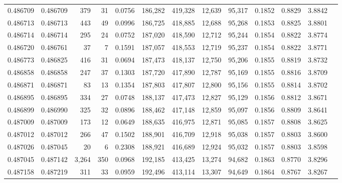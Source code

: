 \begin{tabular}{rrrrrrrrrrrrr}
0.486709 & 0.486709 &   379 &    31 &                                     0.0756 & 186,282 & 419,328 &  12,639 &  95,317 & 0.1852 & 0.8829 & 3.8842 \\
0.486713 & 0.486713 &   443 &    49 &                                     0.0996 & 186,725 & 418,885 &  12,688 &  95,268 & 0.1853 & 0.8825 & 3.8801 \\
0.486714 & 0.486714 &   295 &    24 &                                     0.0752 & 187,020 & 418,590 &  12,712 &  95,244 & 0.1854 & 0.8822 & 3.8774 \\
0.486720 & 0.486761 &    37 &     7 &                                     0.1591 & 187,057 & 418,553 &  12,719 &  95,237 & 0.1854 & 0.8822 & 3.8771 \\
0.486773 & 0.486825 &   416 &    31 &                                     0.0694 & 187,473 & 418,137 &  12,750 &  95,206 & 0.1855 & 0.8819 & 3.8732 \\
0.486858 & 0.486858 &   247 &    37 &                                     0.1303 & 187,720 & 417,890 &  12,787 &  95,169 & 0.1855 & 0.8816 & 3.8709 \\
0.486871 & 0.486871 &    83 &    13 &                                     0.1354 & 187,803 & 417,807 &  12,800 &  95,156 & 0.1855 & 0.8814 & 3.8702 \\
0.486895 & 0.486895 &   334 &    27 &                                     0.0748 & 188,137 & 417,473 &  12,827 &  95,129 & 0.1856 & 0.8812 & 3.8671 \\
0.486899 & 0.486990 &   325 &    32 &                                     0.0896 & 188,462 & 417,148 &  12,859 &  95,097 & 0.1856 & 0.8809 & 3.8641 \\
0.487009 & 0.487009 &   173 &    12 &                                     0.0649 & 188,635 & 416,975 &  12,871 &  95,085 & 0.1857 & 0.8808 & 3.8625 \\
0.487012 & 0.487012 &   266 &    47 &                                     0.1502 & 188,901 & 416,709 &  12,918 &  95,038 & 0.1857 & 0.8803 & 3.8600 \\
0.487026 & 0.487045 &    20 &     6 &                                     0.2308 & 188,921 & 416,689 &  12,924 &  95,032 & 0.1857 & 0.8803 & 3.8598 \\
0.487045 & 0.487142 & 3,264 &   350 &                                     0.0968 & 192,185 & 413,425 &  13,274 &  94,682 & 0.1863 & 0.8770 & 3.8296 \\
0.487158 & 0.487219 &   311 &    33 &                                     0.0959 & 192,496 & 413,114 &  13,307 &  94,649 & 0.1864 & 0.8767 & 3.8267 \\

\end{tabular}
